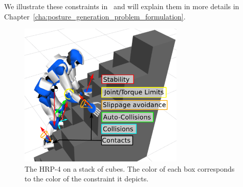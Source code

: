 
We illustrate these constraints in~ and will explain them in more details in Chapter~\ref{cha:posture_generation_problem_formulation}.


\begin{figure}[ht]
  \centering
  \includegraphics[width=0.7\textwidth]{PG.pdf}
  \caption{The HRP-4 on a stack of cubes. The color of each box corresponds to the color of the constraint it depicts.}
\label{fig:PG}
\end{figure}

